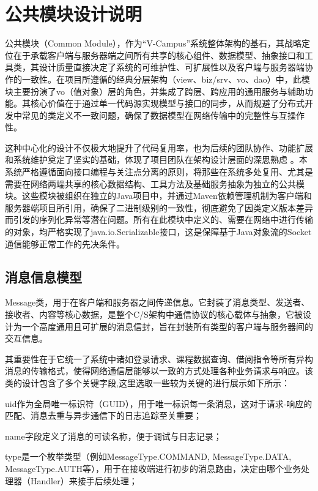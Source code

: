 \ifx\maindoc\undefined
{}
\fi

\section{公共模块设计说明}
公共模块（Common Module），作为“V-Campus”系统整体架构的基石，其战略定位在于承载客户端与服务器端之间所有共享的核心组件、数据模型、抽象接口和工具类，其设计质量直接决定了系统的可维护性、可扩展性以及客户端与服务器端协作的一致性。在项目所遵循的经典分层架构（view、biz/srv、vo、dao）中，此模块主要扮演了vo（值对象）层的角色，并集成了跨层、跨应用的通用服务与辅助功能。其核心价值在于通过单一代码源实现模型与接口的同步，从而规避了分布式开发中常见的类定义不一致问题，确保了数据模型在网络传输中的完整性与互操作性。

这种中心化的设计不仅极大地提升了代码复用率，也为后续的团队协作、功能扩展和系统维护奠定了坚实的基础，体现了项目团队在架构设计层面的深思熟虑 。本系统严格遵循面向接口编程与关注点分离的原则，将那些在系统多处复用、尤其是需要在网络两端共享的核心数据结构、工具方法及基础服务抽象为独立的公共模块。这些模块被组织在独立的Java项目中，并通过Maven依赖管理机制为客户端和服务器端项目所引用，确保了二进制级别的一致性，彻底避免了因类定义版本差异而引发的序列化异常等潜在问题。所有在此模块中定义的、需要在网络中进行传输的对象，均严格实现了java.io.Serializable接口，这是保障基于Java对象流的Socket通信能够正常工作的先决条件。
\subsection{消息信息模型}
Message类，用于在客户端和服务器之间传递信息。它封装了消息类型、发送者、接收者、内容等核心数据，是整个C/S架构中通信协议的核心载体与抽象，它被设计为一个高度通用且可扩展的消息信封，旨在封装所有类型的客户端与服务器间的交互信息。

其重要性在于它统一了系统中诸如登录请求、课程数据查询、借阅指令等所有异构消息的传输格式，使得网络通信层能够以一致的方式处理各种业务请求与响应。该类的设计包含了多个关键字段,这里选取一些较为关键的进行展示如下所示：

uid作为全局唯一标识符（GUID），用于唯一标识每一条消息，这对于请求-响应的匹配、消息去重与异步通信下的日志追踪至关重要；

name字段定义了消息的可读名称，便于调试与日志记录；

type是一个枚举类型（例如MessageType.COMMAND, MessageType.DATA, MessageType.AUTH等），用于在接收端进行初步的消息路由，决定由哪个业务处理器（Handler）来接手后续处理；

